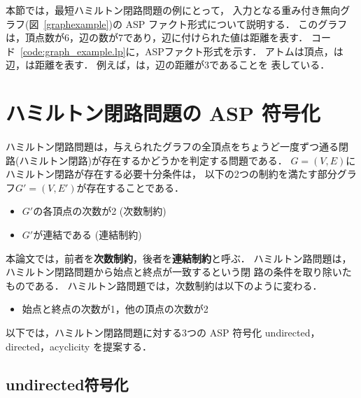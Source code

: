 


本節では，最短ハミルトン閉路問題の例にとって，
入力となる重み付き無向グラフ(図~\ref{graphexample})の
ASP ファクト形式について説明する．
%
このグラフは，頂点数が6，辺の数が7であり，辺に付けられた値は距離を表す．
コード~\ref{code:graph_example.lp}に，ASPファクト形式を示す．
%
アトムは頂点，は辺，は距離を表す．
例えば，は，辺の距離が3であることを
表している．

\section{ハミルトン閉路問題の ASP 符号化}\label{hamiltonianasp}

ハミルトン閉路問題は，与えられたグラフの全頂点をちょうど一度ずつ通る閉
路(ハミルトン閉路)が存在するかどうかを判定する問題である．
$G=(V,E)$にハミルトン閉路が存在する必要十分条件は，
以下の2つの制約を満たす部分グラフ$G'=(V,E')$が存在することである．

\begin{itemize}
\item $G'$の各頂点の次数が2 (次数制約)
\item $G'$が連結である (連結制約)
\end{itemize}

本論文では，前者を\textbf{次数制約}，後者を\textbf{連結制約}と呼ぶ．
ハミルトン路問題は，ハミルトン閉路問題から始点と終点が一致するという閉
路の条件を取り除いたものである．
ハミルトン路問題では，次数制約は以下のように変わる．

\begin{itemize}
\item 始点と終点の次数が1，他の頂点の次数が2
\end{itemize}

以下では，ハミルトン閉路問題に対する3つの ASP 符号化
\textsf{undirected}，\textsf{directed}，\textsf{acyclicity}
を提案する．

\subsection{\textsf{undirected}符号化}

